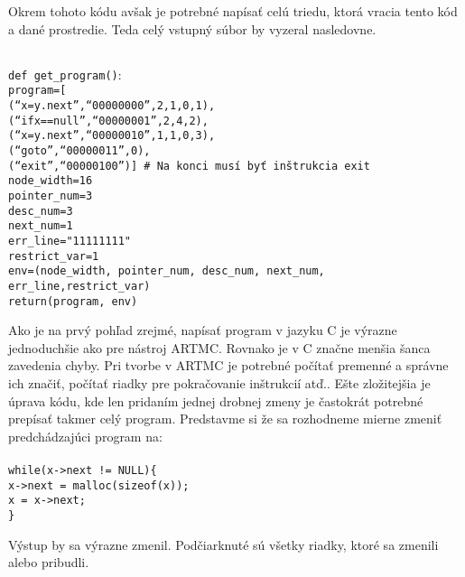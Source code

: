 Okrem tohoto kódu avšak je potrebné napísať celú triedu, ktorá vracia tento kód a dané prostredie.
Teda celý vstupný súbor by vyzeral nasledovne.


\texttt{
\\
def get\_program()$\colon$\\
\tab program=[\\
\tab \tab (``x=y.next'',``00000000'',2,1,0,1),\\
\tab \tab (``ifx==null'',``00000001'',2,4,2),\\
\tab \tab (``x=y.next'',``00000010'',1,1,0,3),\\
\tab \tab (``goto'',``00000011'',0),\\
\tab \tab (``exit'',``00000100'')]   \# Na konci musí byť inštrukcia exit\\
\tab node\_width=16\\
\tab pointer\_num=3\\
\tab desc\_num=3\\
\tab next\_num=1\\
\tab err\_line="11111111"\\
\tab restrict\_var=1\\
\tab env=(node\_width, pointer\_num, desc\_num, next\_num, err\_line,restrict\_var)\\
\tab return(program, env)
}

Ako je na prvý pohľad zrejmé, napísať program v jazyku C je výrazne jednoduchšie ako pre nástroj ARTMC. Rovnako je v C značne menšia šanca zavedenia chyby. Pri tvorbe v ARTMC je potrebné počítať premenné a správne ich značiť, počítať riadky pre pokračovanie inštrukcií atď.. Ešte zložitejšia je úprava kódu, kde len pridaním jednej drobnej zmeny je častokrát potrebné prepísať takmer celý program. Predstavme si že sa rozhodneme mierne zmeniť predchádzajúci program na:\\
\noindent
\texttt{
\\
while(x->next != NULL)\{\\
\tab x->next = malloc(sizeof(x));\\
\tab x = x->next;\\
\}
\\
}

Výstup by sa výrazne zmenil. Podčiarknuté sú všetky riadky, ktoré sa zmenili alebo pribudli.


